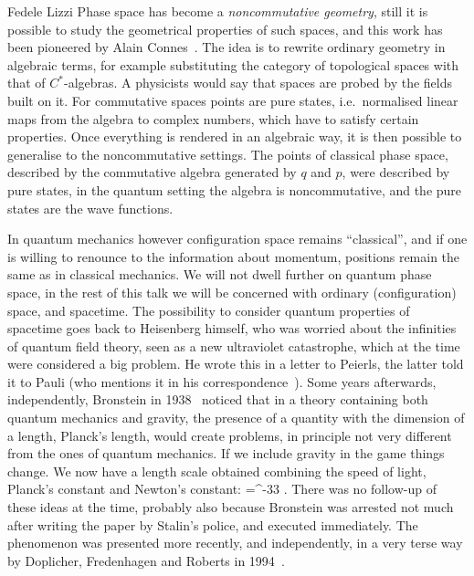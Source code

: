 \begin{artengenv}{Fedele Lizzi}
Phase space has become a \emph{noncommutative geometry}, still it is possible to study the geometrical properties of such spaces, and this work has been pioneered by Alain Connes~\cite{Connesbook}. The idea is to rewrite ordinary geometry in algebraic terms, for example substituting the category of topological spaces with that of $C^*$-algebras. A physicists would say that spaces are probed by the fields built on it. For commutative spaces points are pure states, i.e.\ normalised linear maps from the algebra to complex numbers, which have to satisfy certain properties. Once everything is rendered in an algebraic way, it is then possible to generalise to the noncommutative settings. The points of classical phase space, described by the commutative algebra generated by $q$ and $p$, were described by pure states, in the quantum setting the algebra is noncommutative, and the pure states are the wave functions. 

In quantum mechanics however configuration space remains ``classical'', and if one is willing to renounce to the information about momentum, positions remain the same as in classical mechanics. 
We will not dwell further on quantum phase space, in the rest of this talk we will be concerned with ordinary (configuration) space, and spacetime. The possibility to consider quantum properties of spacetime goes back to Heisenberg himself, who was worried about the infinities of quantum field theory, seen as a new ultraviolet catastrophe, which at the time were considered a big problem. He wrote this in a letter to Peierls, the latter told it to Pauli (who mentions it in his correspondence~\cite{HeisenbergtoPeirleis}). Some years afterwards, independently, Bronstein in 1938~\cite{Bronstein} noticed that in a theory containing both quantum mechanics and gravity, the presence of a quantity with the dimension of a length, Planck's length, would create problems, in principle not very different from the ones of quantum mechanics. If we include gravity in the game things change. We now have a length scale obtained combining the speed of light, Planck's constant and Newton's constant:  
\be
\ell=^{-33} . \label{ell}
\ee
There was no follow-up of these ideas at the time, probably also because Bronstein was arrested not much after writing the paper by Stalin's police, and executed immediately. The phenomenon was presented more recently, and independently, in a very terse way by Doplicher, Fredenhagen and Roberts in 1994~\cite{DFR}.


\end{artengenv}
